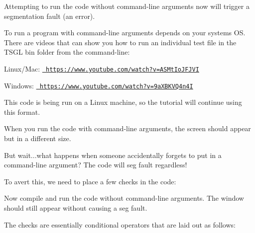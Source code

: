 Attempting to run the code without command-\/line arguments now will trigger a segmentation fault (an error).

To run a program with command-\/line arguments depends on your system\textquotesingle{}s OS. There are videos that can show you how to run an individual test file in the T\+S\+GL bin folder from the command-\/line\+:


\begin{DoxyItemize}
\item Linux/\+Mac\+: \href{https://www.youtube.com/watch?v=ASMtIoJFJVI}{\texttt{ https\+://www.\+youtube.\+com/watch?v=\+A\+S\+Mt\+Io\+J\+F\+J\+VI}}
\item Windows\+: \href{https://www.youtube.com/watch?v=9aXBKVQ4n4I}{\texttt{ https\+://www.\+youtube.\+com/watch?v=9a\+X\+B\+K\+V\+Q4n4I}}
\end{DoxyItemize}

This code is being run on a Linux machine, so the tutorial will continue using this format.

When you run the code with command-\/line arguments, the screen should appear but in a different size.

But wait...what happens when someone accidentally forgets to put in a command-\/line argument? The code will seg fault regardless!

To avert this, we need to place a few checks in the code\+:


\begin{DoxyCode}{0}
\DoxyCodeLine{\textcolor{preprocessor}{\#include <tsgl.h>}}
\DoxyCodeLine{}
\DoxyCodeLine{\}}
\end{DoxyCode}


Now compile and run the code without command-\/line arguments. The window should still appear without causing a seg fault.

The checks are essentially conditional operators that are laid out as follows\+:


